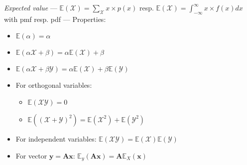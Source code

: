 \emph{Expected value} --- 
$\mathbb{E}(\mathcal{X}) = \sum_{\mathcal{X}}x \times p(x)$ resp. $\mathbb{E}(\mathcal{X}) = \int_{-\infty}^{\infty}x \times f(x)dx$ with pmf resp. pdf --- Properties:
\begin{multicols}{2}
\begin{itemize}
    \item $\mathbb{E}(\alpha)=\alpha$
    \item $\mathbb{E}(\alpha\mathcal{X}+\beta)=\alpha\mathbb{E}(\mathcal{X})+\beta$
    \item $\mathbb{E}(\alpha\mathcal{X} + \beta\mathcal{Y})=\alpha\mathbb{E}(\mathcal{X})+\beta\mathbb{E}(\mathcal{Y})$
    \item For orthogonal variables:
    \begin{itemize}
        \item  $\mathbb{E}(\mathcal{X}\mathcal{Y})=0$
        \item $\mathbb{E}((\mathcal{X}+\mathcal{Y})^2)=\mathbb{E}(\mathcal{X}^2) + \mathbb{E}(\mathcal{Y}^2)$
    \end{itemize}
    \item For independent variables: $\mathbb{E}(\mathcal{X}\mathcal{Y})=\mathbb{E}(\mathcal{X})\mathbb{E}(\mathcal{Y})$
    \item For vector $\boldsymbol{y} = \boldsymbol{A}\boldsymbol{x}$:    $\mathbb{E}_y(\boldsymbol{A}\boldsymbol{x})=\boldsymbol{A}\mathbb{E}_X(\boldsymbol{x})$
\end{itemize}
\end{multicols}

